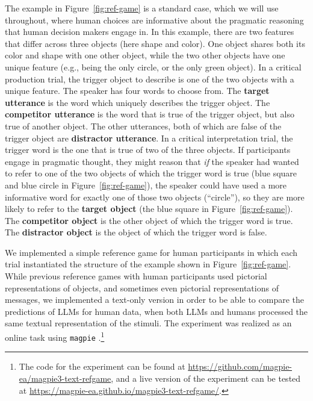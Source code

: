 \documentclass[fleqn]{article}
\begin{document}
The example in Figure~\ref{fig:ref-game} is a standard case, which we will use throughout, where human choices are informative about the pragmatic reasoning that human decision makers engage in.
In this example, there are two features that differ across three objects (here shape and color).
One object shares both its color and shape with one other object, while the two other objects have one unique feature (e.g., being the only circle, or the only green object).
%
In a critical production trial, the trigger object to describe is one of the two objects with a unique feature.
The speaker has four words to choose from.
The \textbf{target utterance} is the word which uniquely describes the trigger object.
The \textbf{competitor utterance} is the word that is true of the trigger object, but also true of another object.
The other utterances, both of which are false of the trigger object are \textbf{distractor utterance}.
%
In a critical interpretation trial, the trigger word is the one that is true of two of the three objects.
If participants engage in pragmatic thought, they might reason that \emph{if} the speaker had wanted to refer to one of the two objects of which the trigger word is true (blue square and blue circle in Figure~\ref{fig:ref-game}), the speaker could have used a more informative word for exactly one of those two objects (``circle''), so they are more likely to refer to the \textbf{target object} (the blue square in Figure~\ref{fig:ref-game}).
The \textbf{competitor object} is the other object of which the trigger word is true.
The \textbf{distractor object} is the object of which the trigger word is false.

We implemented a simple reference game for human participants in which each trial instantiated the structure of the example shown in Figure~\ref{fig:ref-game}.
While previous reference games with human participants used pictorial representations of objects, and sometimes even pictorial representations of messages, we implemented a text-only version in order to be able to compare the predictions of LLMs for human data, when both LLMs and humans processed the same textual representation of the stimuli.
The experiment was realized as an online task using \texttt{magpie} \citep{FrankeJi:magpie:-Minimal}.\footnote{
  The code for the experiment can be found at \href{https://github.com/magpie-ea/magpie3-text-refgame}{https://github.com/magpie-ea/magpie3-text-refgame}, and a live version of the experiment can be tested at \href{https://magpie-ea.github.io/magpie3-text-refgame/}{https://magpie-ea.github.io/magpie3-text-refgame/}.
}
\end{document}
